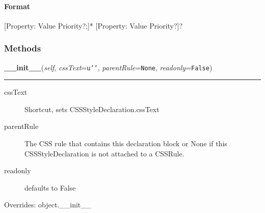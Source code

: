 \hypertarget{format}{}
\paragraph*{Format}
\label{format}

{[}Property: Value Priority?;{]}* {[}Property: Value Priority?{]}?


  \subsubsection{Methods}

    \vspace{0.5ex}

\hspace{.8\funcindent}\begin{boxedminipage}{\funcwidth}

    \raggedright \textbf{\_\_init\_\_}(\textit{self}, \textit{cssText}={\tt \texttt{u'}\texttt{}\texttt{'}}, \textit{parentRule}={\tt None}, \textit{readonly}={\tt False})

    \vspace{-1.5ex}

    \rule{\textwidth}{0.5\fboxrule}
\setlength{\parskip}{2ex}
\begin{description}
\item[{cssText}] \leavevmode 
Shortcut, sets CSSStyleDeclaration.cssText

\item[{parentRule}] \leavevmode 
The CSS rule that contains this declaration block or
None if this CSSStyleDeclaration is not attached to a CSSRule.

\item[{readonly}] \leavevmode 
defaults to False

\end{description}
\setlength{\parskip}{1ex}
      Overrides: object.\_\_init\_\_

    \end{boxedminipage}

    \label{cssutils:css:cssstyledeclaration:CSSStyleDeclaration:__contains__}


